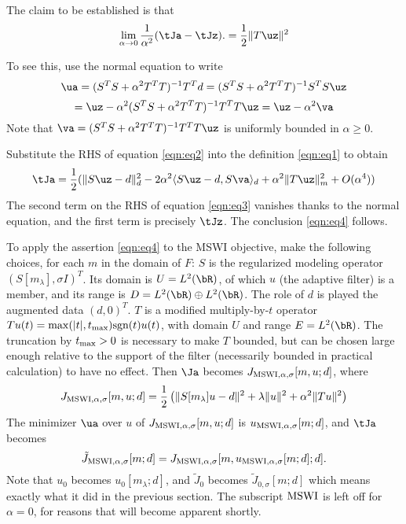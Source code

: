 The claim to be established is that
\begin{equation}
  \label{eqn:eq4}
  \lim_{\alpha \rightarrow 0} \frac{1}{\alpha^2}  (\tJa-\tJz).= \frac{1}{2}\|T\uz\|^2
\end{equation}

To see this, use the normal equation to write
\[
  \ua = (S^TS + \alpha^2 T^TT)^{-1}T^Td = (S^TS + \alpha^2 T^TT)^{-1}S^TS \uz
\]
\begin{equation}
  \label{eqn:eq2}
  = \uz - \alpha^2 (S^TS + \alpha^2 T^TT)^{-1}T^TT\uz = \uz-\alpha^2 \va
\end{equation}
Note that $\va = (S^TS + \alpha^2 T^TT)^{-1}T^TT\uz$ is uniformly bounded in $\alpha \ge 0$.

Substitute the RHS of equation \ref{eqn:eq2} into the definition \ref{eqn:eq1} to obtain
\begin{equation}
  \label{eqn:eq3}
  \tJa = \frac{1}{2}(\|S\uz-d\|_d^2 - 2 \alpha^2\langle S\uz-d, S\va\rangle_d + \alpha^2\|T\uz\|_m^2 + O(\alpha^4))
\end{equation}
The second term on the RHS of equation \ref{eqn:eq3} vanishes thanks to the normal equation, and the first term is precisely $\tJz$. The conclusion \ref{eqn:eq4} follows.

To apply the assertion \ref{eqn:eq4} to the MSWI objective, make the
following choices, for each $m$ in the domain of $F$: $S$ is the regularized
modeling operator $(S[m_{\lambda}],\sigma I)^T$.  Its domain is $U=L^2(\bR)$, of
which $u$ (the adaptive filter) is a member, and 
its range is $D = L^2(\bR) \oplus
L^2(\bR)$. The role of $d$ is played  the
augmented data $(d,0)^T$. $T$ is a modified multiply-by-$t$ operator
$Tu(t)=\max(|t|, t_{\rm max}) \mbox{sgn}(t)u(t)$, with domain $U$ and
range $E=L^2(\bR)$. The truncation by $t_{\rm max} > 0$ is necessary
to make $T$ bounded, but can be chosen large enough relative to the
support of the filter (necessarily bounded in practical calculation)
to have no effect. Then $\Ja$ becomes $J_{{\rm MSWI},\alpha,\sigma}[m,u;d]$, where
\begin{equation}
  \label{eqn:eq5}
   J_{{\rm MSWI},\alpha,\sigma}[m,u;d] = \frac{1}{2}\left(\|S[m_{\lambda}]u-d\|^2 +
   \lambda\|u\|^2 + \alpha^2\|Tu\|^2\right)
 \end{equation}
The minimizer $\ua$ over $u$ of $ J_{{\rm MSWI}, \alpha,\sigma}[m,u;d]$ is
$u_{{\rm MSWI},\alpha,\sigma}[m;d]$, and $\tJa$ becomes
\begin{equation}
  \label{eqn:eq6}
  \tilde{J}_{{\rm MSWI},\alpha,\sigma}[m;d] =
  J_{{\rm MSWI},\alpha,\sigma}[m,u_{{\rm MSWI},\alpha,\sigma}[m;d];d].
\end{equation}
Note that $u_0$ becomes $u_0[m_{\lambda};d]$, and $\tilde{J}_0$ becomes
$\tilde{J}_{0,\sigma}[m;d]$ which means exactly what
it did in the previous section. The subscript ${\rm MSWI}$ is left
off for $\alpha=0$, for reasons that will become apparent shortly.

